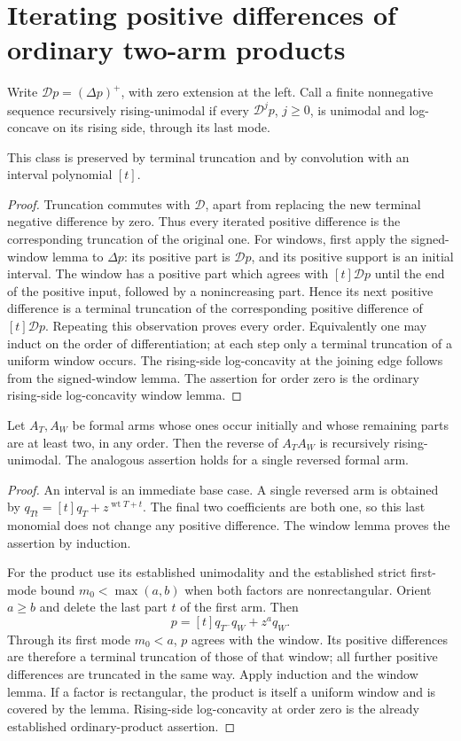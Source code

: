 \section{Iterating positive differences of ordinary two-arm products}
Write $\mathcal D p=(\Delta p)^+$, with zero extension at the left.
Call a finite nonnegative sequence recursively rising-unimodal if every
$\mathcal D^j p$, $j\ge0$, is unimodal and log-concave on its rising
side, through its last mode.

\begin{lemma}
This class is preserved by terminal truncation and by convolution with
an interval polynomial $[t]$.
\end{lemma}
\begin{proof}
Truncation commutes with $\mathcal D$, apart from replacing the new
terminal negative difference by zero. Thus every iterated positive
difference is the corresponding truncation of the original one.
For windows, first apply the signed-window lemma to $\Delta p$:
its positive part is $\mathcal Dp$, and its positive support is an
initial interval. The window has a positive part which agrees with
$[t]\mathcal Dp$ until the end of the positive input, followed by a
nonincreasing part. Hence its next positive difference is a terminal
truncation of the corresponding positive difference of
$[t]\mathcal Dp$. Repeating this observation proves every order.
Equivalently one may induct on the order of differentiation; at each
step only a terminal truncation of a uniform window occurs. The
rising-side log-concavity at the joining edge follows from the
signed-window lemma. The assertion for order zero is the ordinary
rising-side log-concavity window lemma.
\end{proof}

\begin{theorem}
Let $A_T,A_W$ be formal arms whose ones occur initially and whose
remaining parts are at least two, in any order. Then the reverse of
$A_TA_W$ is recursively rising-unimodal. The analogous assertion
holds for a single reversed formal arm.
\end{theorem}
\begin{proof}
An interval is an immediate base case. A single reversed arm is
obtained by $q_{Tt}=[t]q_T+z^{\operatorname{wt}T+t}$.
The final two coefficients are both one, so this last monomial
does not change any positive difference. The window lemma proves
the assertion by induction.

For the product use its established unimodality and the established
strict first-mode bound $m_0<\max(a,b)$ when both factors are
nonrectangular. Orient $a\ge b$ and delete the last part $t$ of
the first arm. Then
\[
 p=[t]q_{T^-}q_W+z^a q_W.
\]
Through its first mode $m_0<a$, $p$ agrees with the window. Its
positive differences are therefore a terminal truncation of those
of that window; all further positive differences are truncated in
the same way. Apply induction and the window lemma. If a factor is
rectangular, the product is itself a uniform window and is covered
by the lemma. Rising-side log-concavity at order zero is the
already established ordinary-product assertion.
\end{proof}

